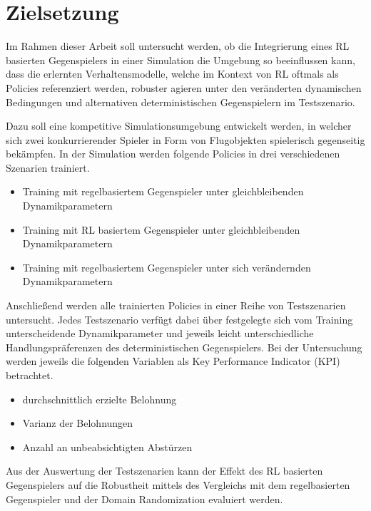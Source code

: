 \section{Zielsetzung}

Im Rahmen dieser Arbeit soll untersucht werden, ob die Integrierung eines RL basierten Gegenspielers in einer Simulation die Umgebung so beeinflussen kann, dass die erlernten Verhaltensmodelle, welche im Kontext von RL oftmals als Policies referenziert werden, robuster agieren unter den veränderten dynamischen Bedingungen und alternativen deterministischen Gegenspielern im Testszenario. 

Dazu soll eine kompetitive Simulationsumgebung entwickelt werden, in welcher sich zwei konkurrierender Spieler in Form von Flugobjekten spielerisch gegenseitig bekämpfen.
In der Simulation werden folgende Policies in drei verschiedenen Szenarien trainiert.

\begin{itemize}
    \item Training mit regelbasiertem Gegenspieler unter gleichbleibenden Dynamikparametern
    \item Training mit RL basiertem Gegenspieler unter gleichbleibenden Dynamikparametern
    \item Training mit regelbasiertem Gegenspieler unter sich verändernden Dynamikparametern
\end{itemize}

Anschließend werden alle trainierten Policies in einer Reihe von Testszenarien untersucht.
Jedes Testszenario verfügt dabei über festgelegte sich vom Training unterscheidende Dynamikparameter und jeweils leicht unterschiedliche Handlungspräferenzen des deterministischen Gegenspielers.
Bei der Untersuchung werden jeweils die folgenden Variablen als Key Performance Indicator (KPI) betrachtet.
\begin{itemize}
    \item durchschnittlich erzielte Belohnung
    \item Varianz der Belohnungen
    \item Anzahl an unbeabsichtigten Abstürzen
\end{itemize}

Aus der Auswertung der Testszenarien kann der Effekt des RL basierten Gegenspielers auf die Robustheit mittels des Vergleichs mit dem regelbasierten Gegenspieler und der Domain Randomization evaluiert werden.

